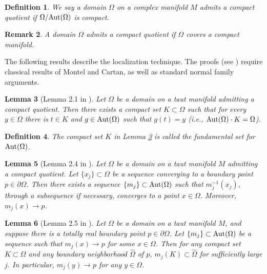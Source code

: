 \documentclass[12pt]{article}
\newcommand{\Aut}{\textup{Aut}}
\newtheorem{lemma}{Lemma}[section]
\newtheorem{defnition}[lemma]{Definition}
\newtheorem{remrk}[lemma]{Remark}
\newenvironment{definition}{\begin{defnition} \em}{\end{defnition}}
\newenvironment{remark}{\begin{remrk} \em}{\end{remrk}}
\begin{document}
\begin{definition}
\label{compactquotientdef}
We say a domain $\Omega$ on a complex manifold $M$ \textit{admits a compact quotient} if $\Omega/\Aut(\Omega)$ is compact.
\end{definition}

\begin{remark}
A domain $\Omega$ admits a compact quotient if $\Omega$ covers a compact manifold.
\end{remark}

The following results describe the localization technique. The proofs (see \cite{LW}) require classical results of Montel and Cartan, as well as standard normal family arguments.

\begin{lemma}[Lemma 2.1 in \cite{LW}]
\label{LWLem2.1}
Let $\Omega$ be a domain on a taut manifold admitting a compact quotient. Then there exists a compact set $K\subset\Omega$ such that for every $y\in\Omega$ there is $t\in K$ and $g\in\Aut(\Omega)$ such that $g(t)=y$ (i.e., $\Aut(\Omega)\cdot K=\Omega$).
\end{lemma}

\begin{definition}
\label{fundamentalsetdef}
The compact set $K$ in Lemma \ref{LWLem2.1} is called the \textit{fundamental set} for $\Aut(\Omega)$.
\end{definition}

\begin{lemma}[Lemma 2.4 in \cite{LW}]
\label{LWLem2.4}
    Let $\Omega$ be a domain on a taut manifold $M$ admitting a compact quotient. Let $\{x_j\}\subset\Omega$ be a sequence converging to a boundary point $p\in\partial\Omega$. Then there exists a sequence $\{m_j\}\subset\Aut(\Omega)$ such that $m_j^{-1}(x_j)$, through a subsequence if necessary, converges to a point $x\in\Omega$. Moreover, $m_j(x)\to p$.
\end{lemma}

\begin{lemma}[Lemma 2.5 in \cite{LW}]
\label{LWLem2.5}
Let $\Omega$ be a domain on a taut manifold $M$, and suppose there is a totally real boundary point $p\in\partial\Omega$. Let $\{m_j\}\subset\Aut(\Omega)$ be a sequence such that $m_j(x)\to p$ for some $x\in\Omega$. Then for any compact set $K\subset\Omega$ and any boundary neighborhood $\widehat{\Omega}$ of $p$, $m_j(K)\subset\widehat{\Omega}$ for sufficiently large $j$. In particular, $m_j(y)\to p$ for any $y\in\Omega$.
\end{lemma}
\end{document}
